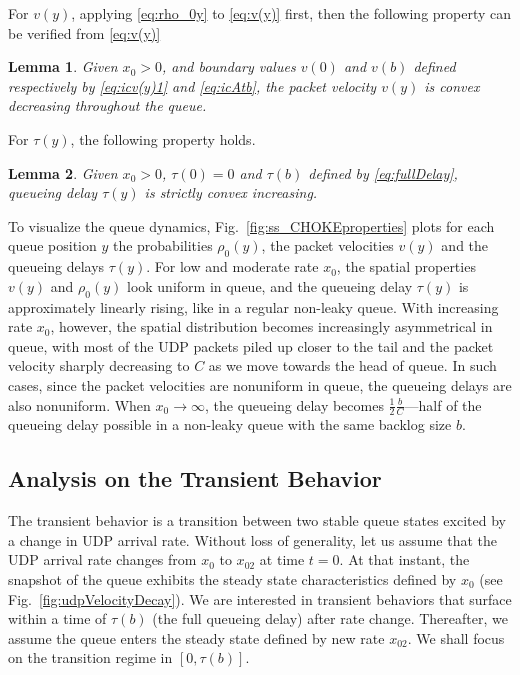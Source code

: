 \documentclass{IEEEtran}
\newtheorem{lemma}{Lemma}
\begin{document}
For $v(y)$, applying \eqref{eq:rho_0y} to \eqref{eq:v(y)} first, then the following property can be verified from \eqref{eq:v(y)}
    \begin{lemma}\label{eq:lemmavY}
        Given $x_0>0$, and boundary values $v(0)$ and $v(b)$ defined respectively by \eqref{eq:icv(y)1} and \eqref{eq:icAtb}, the packet velocity $v(y)$ is convex decreasing throughout the queue.
    \end{lemma}

For $\tau(y)$, the following property holds.
    \begin{lemma}\label{eq:lemmaTauY}
        Given $x_0>0$, $\tau(0)=0$ and $\tau(b)$ defined by \eqref{eq:fullDelay},  queueing delay $\tau(y)$ is strictly convex increasing.
    \end{lemma}

        To visualize the queue dynamics, Fig.~\ref{fig:ss_CHOKEproperties} plots for each queue position $y$ the probabilities $\rho_0(y)$, the packet velocities $v(y)$  and the queueing delays $\tau(y)$. For low and moderate rate $x_0$, the spatial properties  $v(y)$ and $\rho_0(y)$ look uniform in queue, and the queueing delay $\tau(y)$ is approximately linearly rising, like in a regular non-leaky queue. With increasing rate $x_0$, however, the spatial distribution becomes increasingly asymmetrical in queue, with most of the UDP packets piled up closer to the tail and the packet velocity sharply decreasing to $C$ as we move towards the head of queue. In such cases, since the packet velocities are nonuniform in queue, the queueing delays are also nonuniform. When $x_0\rightarrow \infty$,  the queueing delay becomes $\frac{1}{2}\frac{b}{C}$---half of the queueing delay possible in a non-leaky queue with the same backlog size $b$.

    \subsection{Analysis on the Transient Behavior}\label{subsec:transient}
The transient behavior is a transition between two stable queue states excited by a change in UDP arrival rate. Without loss of generality, let us assume that the UDP arrival rate changes from $x_0$ to $x_{02}$ at time $t=0$. At that instant, the snapshot of the queue exhibits the steady state characteristics defined by $x_0$ (see Fig.~\ref{fig:udpVelocityDecay}). We are interested in transient behaviors that surface within a time of $\tau(b)$ (the full queueing delay) after rate change. Thereafter, we assume the queue enters the steady state defined by new rate $x_{02}$. We shall focus on the transition regime in $[0,\tau(b)]$.
\end{document}
